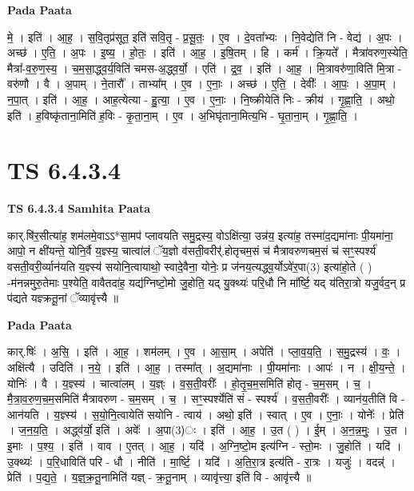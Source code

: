 \documentclass[17pt]{extarticle}
\begin{document}
\textbf{Pada Paata} \newline

मे॒ । इति॑ । आ॒ह॒ । स॒वि॒तृप्र॑सूत॒ इति॑ सवि॒तृ - प्र॒सू॒तः॒ । ए॒व । दे॒वता᳚भ्यः । नि॒वेद्येति॑ नि - वेद्य॑ । अ॒पः । अच्छ॑ । ए॒ति॒ । अ॒पः । इ॒ष्य॒ । हो॒तः॒ । इति॑ । आ॒ह॒ । इ॒षि॒तम् । हि । कर्म॑ । क्रि॒यते᳚ । मैत्रा॑वरुण॒स्येति॒ मैत्रा᳚-व॒रु॒ण॒स्य॒ । च॒म॒सा॒द्ध्व॒र्य॒विति॑ चमस-अ॒द्ध्व॒र्यो॒ । एति॑ । द्र॒व॒ । इति॑ । आ॒ह॒ । मि॒त्रावरु॑णा॒विति॑ मि॒त्रा - वरु॑णौ । वै । अ॒पाम् । ने॒तारौ᳚ । ताभ्या᳚म् । ए॒व । ए॒नाः॒ । अच्छ॑ । ए॒ति॒ । देवीः᳚ । आ॒पः॒ । अ॒पा॒म् । न॒पा॒त् । इति॑ । आ॒ह॒ । आह॒त्येत्या - हु॒त्या॒ । ए॒व । ए॒नाः॒ । नि॒ष्क्रीयेति॑ निः - क्रीय॑ । गृ॒ह्णा॒ति॒ । अथो॒ इति॑ । ह॒विष्कृ॑ताना॒मिति॑ ह॒विः - कृ॒ता॒ना॒म् । ए॒व । अ॒भिघृ॑ताना॒मित्य॒भि - घृ॒ता॒ना॒म् । गृ॒ह्णा॒ति॒ ।  \newline




\section*{ TS 6.4.3.4 }

\textbf{TS 6.4.3.4 } \newline
\textbf{Samhita Paata} \newline

कार्.षि॑र॒सीत्या॑ह॒ शम॑लमे॒वाऽऽ*सा॒मप॑ प्लावयति समु॒द्रस्य॒ वोऽक्षि॑त्या॒ उन्न॑य॒ इत्या॑ह॒ तस्मा॑द॒द्यमा॑नाः पी॒यमा॑ना॒ आपो॒ न क्षी॑यन्ते॒ योनि॒र्वै य॒ज्ञ्स्य॒ चात्वा॑लं ॅय॒ज्ञो व॑सती॒वरीर्॑.होतृचम॒सं च॑ मैत्रावरुणचम॒सं च॑ सꣳ॒॒स्पर्श्य॑ वसती॒वरी॒र्व्यान॑यति य॒ज्ञ्स्य॑ सयोनि॒त्वायाथो॒ स्वादे॒वैना॒ योनेः॒ प्र ज॑नय॒त्यद्ध्व॒र्योऽवे॑र॒पा(3) इत्या॑हो॒ते ( ) -म॑नन्नमुरु॒तेमाः प॒श्येति॒ वावैतदा॑ह॒ यद्य॑ग्निष्टो॒मो जु॒होति॒ यद् यु॒क्थ्यः॑ परि॒धौ नि मा᳚र्ष्टि॒ यद् य॑तिरा॒त्रो यजु॒र्वद॒न् प्र प॑द्यते यज्ञ्क्रतू॒नां ॅव्यावृ॑त्त्यै ॥ \newline

\textbf{Pada Paata} \newline

कार्.षिः॑ । अ॒सि॒ । इति॑ । आ॒ह॒ । शम॑लम् । ए॒व । आ॒सा॒म् । अपेति॑ । प्ला॒व॒य॒ति॒ । स॒मु॒द्रस्य॑ । वः॒ । अक्षि॑त्यै । उदिति॑ । न॒ये॒ । इति॑ । आ॒ह॒ । तस्मा᳚त् । अ॒द्यमा॑नाः । पी॒यमा॑नाः । आपः॑ । न । क्षी॒य॒न्ते॒ । योनिः॑ । वै । य॒ज्ञ्स्य॑ । चात्वा॑लम् । य॒ज्ञ्ः । व॒स॒ती॒वरीः᳚ । हो॒तृ॒च॒म॒समिति॑ होतृ - च॒म॒सम् । च॒ । मै॒त्रा॒व॒रु॒ण॒च॒म॒समिति॑ मैत्रावरुण - च॒म॒सम् । च॒ । सꣳ॒॒स्पर्श्येति॑ सं - स्पर्श्य॑ । व॒स॒ती॒वरीः᳚ । व्यान॑य॒तीति॑ वि - आन॑यति । य॒ज्ञ्स्य॑ । स॒यो॒नि॒त्वायेति॑ सयोनि - त्वाय॑ । अथो॒ इति॑ । स्वात् । ए॒व । ए॒नाः॒ । योनेः᳚ । प्रेति॑ । ज॒न॒य॒ति॒ । अद्ध्व॑र्यो॒ इति॑ । अवेः᳚ । अ॒पा(3)ः । इति॑ । आ॒ह॒ । उ॒त ( ) । ई॒म् । अ॒न॒न्न॒मुः॒ । उ॒त । इ॒माः । प॒श्य॒ । इति॑ । वाव । ए॒तत् । आ॒ह॒ । यदि॑ । अ॒ग्नि॒ष्टो॒म इत्य॑ग्नि - स्तो॒मः । जु॒होति॑ । यदि॑ । उ॒क्थ्यः॑ । प॒रि॒धाविति॑ परि - धौ । नीति॑ । मा॒र्ष्टि॒ । यदि॑ । अ॒ति॒रा॒त्र इत्य॑ति - रा॒त्रः । यजुः॑ । वदन्न्॑ । प्रेति॑ । प॒द्य॒ते॒ । य॒ज्ञ्॒क्र॒तू॒नामिति॑ यज्ञ् - क्र॒तू॒नाम् । व्यावृ॑त्त्या॒ इति॑ वि - आवृ॑त्त्यै ॥  \newline
\end{document}
